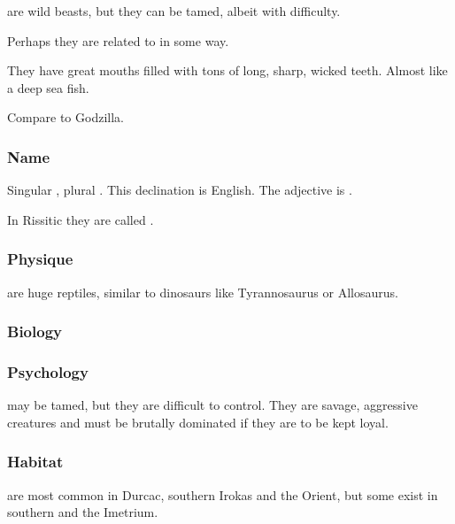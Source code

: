 \Cortios{} are wild beasts, but they can be tamed, albeit with difficulty. 

Perhaps they are related to \dragons{} in some way. 

They have great mouths filled with tons of long, sharp, wicked teeth. Almost like a deep sea fish. 

Compare to Godzilla. 









\subsubsection{Name}
Singular \emph{\cortio{}}, plural \emph{\cortios{}}. 
This declination is English. 
The adjective is \emph{\cortio{}}. 

In Rissitic they are called \emph{\tashrek{}}. 









\subsubsection{Physique}
\Cortios{} are huge reptiles, similar to dinosaurs like Tyrannosaurus or Allosaurus. 









\subsubsection{Biology}








\subsubsection{Psychology}
\Cortios{} may be tamed, but they are difficult to control. They are savage, aggressive creatures and must be brutally dominated if they are to be kept loyal. 









\subsubsection{Habitat}
\Cortios{} are most common in Durcac, southern Irokas and the Orient, but some exist in southern \Velcad{} and the Imetrium. 















